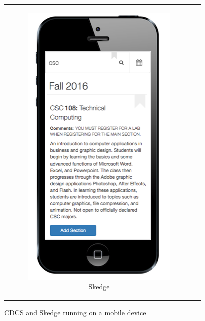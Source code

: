 \begin{figure}[ht]
\begin{tabular}{c c}
    \begin{subfigure}[h]{4.4cm}
      \centering
      \includegraphics[width=1.00\textwidth]{images/skedge/mobile}
      \caption{Skedge} \label{fig:sk-mobile}
    \end{subfigure}
  \end{tabular}
  \caption{CDCS and Skedge running on a mobile device}
\end{figure}


